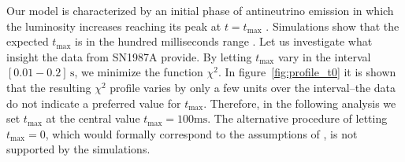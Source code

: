 \documentclass[a4paper,11pt]{article}
\begin{document}







\label{subsec:rising_time}
Our model is characterized by an initial phase of antineutrino emission in which the luminosity increases reaching its peak at $t=t_{\text{max}}$
\cite{sym13101851}.  Simulations show that the expected    
$t_{\text{max}}$ is in the hundred milliseconds range \cite{Pagliaroli:2009qy,PhysRevD.80.087301,Kotake:2005zn, Marek:2007gr}. 
Let us investigate what insight the data from SN1987A provide. By letting $t_{\text{max}}$ vary in the interval $\left[0.01 - 0.2\right]\,\mbox{s}$, we minimize the function $\chi^2$. In figure~\ref{fig:profile_t0} it is shown that the resulting $\chi^2$ profile varies by only a few units over the interval--the data do not indicate a preferred value for $t_{\text{max}}$. Therefore, in the following analysis 
 we set $t_{\text{max}}$ at the central value $t_{\text{max}}=100\mbox{ms}$.
 The alternative procedure of letting $t_{\text{max}}=0$, which would formally correspond to the assumptions of \cite{Loredo:2001rx, Pagliaroli:2008ur,DedinNeto:2023hhp}, is not supported by the simulations.

\end{document}
